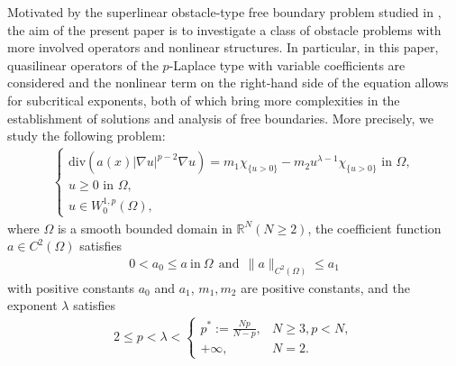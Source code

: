 \documentclass[onecolumn]{autart}
\begin{document}
Motivated by the superlinear obstacle-type free boundary problem studied in \cite{Wang:2025}, the aim of the present paper is to investigate a class of obstacle problems with  more involved operators and nonlinear structures. In particular, in this paper, quasilinear operators of the $p$-Laplace type with variable coefficients  are considered and the nonlinear term on the right-hand side of the equation allows for subcritical exponents, both of which bring  more complexities  in the establishment of solutions and analysis of free boundaries. More precisely, we  study the following problem:
\begin{align} \label{main}
	\begin{cases}
		\mathrm{div}\left( a(x)|\nabla u|^{p-2}\nabla u\right)  = m_1 \chi_{\{u>0\}} - m_2 u^{\lambda - 1} \chi_{\{u > 0\}}  \text{ in } \Omega, \\
		u \geq 0  \text{ in } \Omega, \\
		u \in W_0^{1,p}(\Omega),
	\end{cases}
\end{align}
where $\Omega  $ is a smooth bounded domain in $ \mathbb{R}^N (N \geq  2)$, the coefficient function $a \in C^2(\Omega)$ satisfies
\begin{align*}
	0<a_0\leq a \ \text{in}\ \Omega  \ \ \text{and}\ \ \|a\|_{C^2(\Omega)} \leq a_1
\end{align*}
with positive constants $a_0$ and $a_1$,   $m_1, m_2  $ are positive constants, and the exponent $\lambda$ satisfies
\begin{align}\label{p-condition}
	2\leq p < \lambda <
	\begin{cases}
		p^*:= \frac{Np}{N-p}, & N \geq 3, p<N, \\
		+\infty, & N = 2.
	\end{cases}
\end{align}
\end{document}
